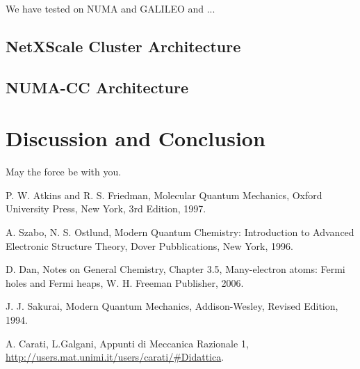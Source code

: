 \documentclass[a4paper,12pt]{article}
\begin{document}
We have tested on NUMA and GALILEO and ...


\subsection{NetXScale Cluster Architecture}\label{galileoarch:sec}
\subsection{NUMA-CC Architecture}\label{numaarch:sec}


\section{Discussion and Conclusion}

May the force be with you.



\clearpage
{}
\begin{thebibliography}{9}


%
%

P. W. Atkins and R. S. Friedman,
Molecular Quantum Mechanics,
Oxford University Press, New York,
3rd Edition,
1997.

A. Szabo, N. S. Ostlund,
Modern Quantum Chemistry: Introduction to Advanced Electronic Structure Theory,
Dover Pubblications, New York,
1996.

D. Dan, Notes on General Chemistry,
Chapter 3.5, Many-electron atoms: Fermi holes and Fermi heaps,
W. H. Freeman Publisher,
2006.

J. J. Sakurai,
Modern Quantum Mechanics,
Addison-Wesley,
Revised Edition,
1994.

A. Carati, L.Galgani,
Appunti di Meccanica Razionale 1,
\url{http://users.mat.unimi.it/users/carati/#Didattica}.

\end{thebibliography}
\end{document}
